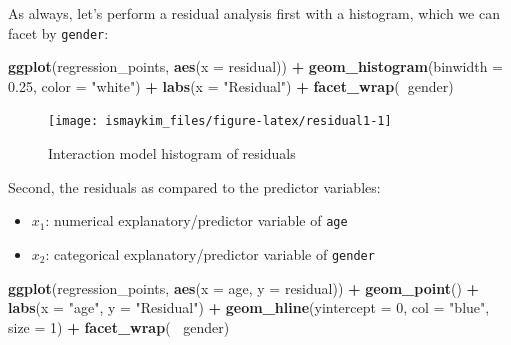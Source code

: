 \documentclass[12pt, krantz2,]{krantz}
\makeatletter
\newenvironment{Shaded}{\begin{snugshade}}{\end{snugshade}}
\newcommand{\DataTypeTok}[1]{\textcolor[rgb]{0.27,0.27,0.27}{#1}}
\newcommand{\DecValTok}[1]{\textcolor[rgb]{0.06,0.06,0.06}{#1}}
\newcommand{\FloatTok}[1]{\textcolor[rgb]{0.06,0.06,0.06}{#1}}
\newcommand{\KeywordTok}[1]{\textcolor[rgb]{0.27,0.27,0.27}{\textbf{#1}}}
\newcommand{\NormalTok}[1]{#1}
\newcommand{\OperatorTok}[1]{\textcolor[rgb]{0.43,0.43,0.43}{\textbf{#1}}}
\newcommand{\StringTok}[1]{\textcolor[rgb]{0.5,0.5,0.5}{#1}}
\providecommand{\tightlist}{%
  \setlength{\itemsep}{0pt}\setlength{\parskip}{0pt}}
\newenvironment{kframe}{%
\medskip{}
\setlength{\fboxsep}{.8em}
 \def\at@end@of@kframe{}%
 \ifinner\ifhmode%
  \def\at@end@of@kframe{\end{minipage}}%
  \begin{minipage}{\columnwidth}%
 \fi\fi%
 \def\FrameCommand##1{\hskip\@totalleftmargin \hskip-\fboxsep
 \colorbox{shadecolor}{##1}\hskip-\fboxsep
     \hskip-\linewidth \hskip-\@totalleftmargin \hskip\columnwidth}%
 \MakeFramed {\advance\hsize-\width
   \@totalleftmargin\z@ \linewidth\hsize
   \@setminipage}}%
 {\par\unskip\endMakeFramed%
 \at@end@of@kframe}
\renewenvironment{Shaded}{\begin{kframe}}{\end{kframe}}
\makeatother
\begin{document}
As always, let's perform a residual analysis first with a histogram, which we can facet by \texttt{gender}:

\begin{Shaded}
\begin{Highlighting}[]
\KeywordTok{ggplot}\NormalTok{(regression_points, }\KeywordTok{aes}\NormalTok{(}\DataTypeTok{x =}\NormalTok{ residual)) }\OperatorTok{+}
\StringTok{  }\KeywordTok{geom_histogram}\NormalTok{(}\DataTypeTok{binwidth =} \FloatTok{0.25}\NormalTok{, }\DataTypeTok{color =} \StringTok{"white"}\NormalTok{) }\OperatorTok{+}
\StringTok{  }\KeywordTok{labs}\NormalTok{(}\DataTypeTok{x =} \StringTok{"Residual"}\NormalTok{) }\OperatorTok{+}
\StringTok{  }\KeywordTok{facet_wrap}\NormalTok{(}\OperatorTok{~}\NormalTok{gender)}
\end{Highlighting}
\end{Shaded}

\begin{figure}

{\centering \texttt{[image: ismaykim\_files/figure-latex/residual1-1]} 

}

\caption{Interaction model histogram of residuals}\label{fig:residual1}
\end{figure}

Second, the residuals as compared to the predictor variables:

\begin{itemize}
\tightlist
\item
  \(x_1\): numerical explanatory/predictor variable of \texttt{age}
\item
  \(x_2\): categorical explanatory/predictor variable of \texttt{gender}
\end{itemize}

\begin{Shaded}
\begin{Highlighting}[]
\KeywordTok{ggplot}\NormalTok{(regression_points, }\KeywordTok{aes}\NormalTok{(}\DataTypeTok{x =}\NormalTok{ age, }\DataTypeTok{y =}\NormalTok{ residual)) }\OperatorTok{+}
\StringTok{  }\KeywordTok{geom_point}\NormalTok{() }\OperatorTok{+}
\StringTok{  }\KeywordTok{labs}\NormalTok{(}\DataTypeTok{x =} \StringTok{"age"}\NormalTok{, }\DataTypeTok{y =} \StringTok{"Residual"}\NormalTok{) }\OperatorTok{+}
\StringTok{  }\KeywordTok{geom_hline}\NormalTok{(}\DataTypeTok{yintercept =} \DecValTok{0}\NormalTok{, }\DataTypeTok{col =} \StringTok{"blue"}\NormalTok{, }\DataTypeTok{size =} \DecValTok{1}\NormalTok{) }\OperatorTok{+}
\StringTok{  }\KeywordTok{facet_wrap}\NormalTok{(}\OperatorTok{~}\StringTok{ }\NormalTok{gender)}
\end{Highlighting}
\end{Shaded}
\end{document}
